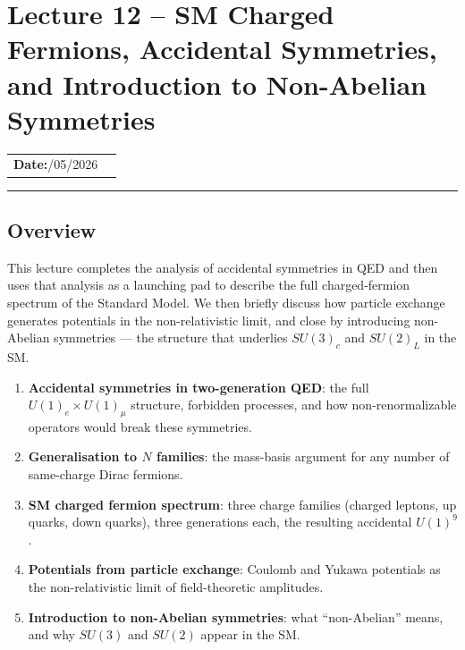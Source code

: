 \documentclass[../main.tex]{subfiles}
\begin{document}
\section{Lecture 12 -- SM Charged Fermions, Accidental Symmetries, and Introduction to Non-Abelian Symmetries}\label{sec:lec12}
\begin{center}
\begin{tabular}{ll}
  \textbf{Date:}\quad 17/05/2026 & \\
\end{tabular}
\end{center}
\hrule\vspace{1.5em}

\subsection*{Overview}

This lecture completes the analysis of accidental symmetries in QED and then uses that analysis as a launching pad to describe the full charged-fermion spectrum of the Standard Model.  We then briefly discuss how particle exchange generates potentials in the non-relativistic limit, and close by introducing non-Abelian symmetries — the structure that underlies $SU(3)_c$ and $SU(2)_L$ in the SM.

\begin{enumerate}
  \item \textbf{Accidental symmetries in two-generation QED}: the full $U(1)_e\times U(1)_\mu$ structure, forbidden processes, and how non-renormalizable operators would break these symmetries.
  \item \textbf{Generalisation to $N$ families}: the mass-basis argument for any number of same-charge Dirac fermions.
  \item \textbf{SM charged fermion spectrum}: three charge families (charged leptons, up quarks, down quarks), three generations each, the resulting accidental $U(1)^9$.
  \item \textbf{Potentials from particle exchange}: Coulomb and Yukawa potentials as the non-relativistic limit of field-theoretic amplitudes.
  \item \textbf{Introduction to non-Abelian symmetries}: what ``non-Abelian'' means, and why $SU(3)$ and $SU(2)$ appear in the SM.
\end{enumerate}

\end{document}

